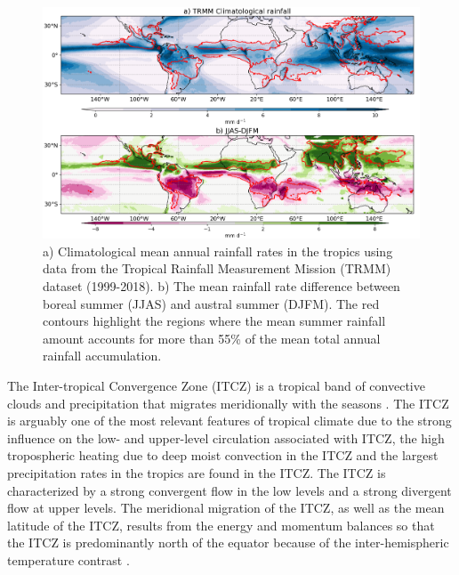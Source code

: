

\begin{figure}[b!]
\includegraphics[width=\linewidth]{figures/trmmclima.png}
\caption[The global monsoon rainfall]{a) Climatological mean annual rainfall rates in the tropics using data from the Tropical Rainfall Measurement Mission (TRMM) dataset (1999-2018). b) The mean rainfall rate difference between boreal summer (JJAS) and austral summer (DJFM). The red contours highlight the regions where the mean summer rainfall amount accounts for more than 55\% of the mean total annual rainfall accumulation. }
\label{fig:monsoon}
\end{figure}

The Inter-tropical Convergence Zone (ITCZ) is a tropical band of convective clouds and precipitation that migrates meridionally with the seasons \citep{schneider2014}. The ITCZ is arguably one of the most relevant features of tropical climate due to the strong influence on the low- and upper-level circulation associated with ITCZ, the high tropospheric heating due to deep moist convection in the ITCZ and the largest precipitation rates in the tropics are found in the ITCZ.
The ITCZ is characterized by a strong convergent flow in the low levels and a strong divergent flow at upper levels. 
The meridional migration of the ITCZ, as well as the mean latitude of the ITCZ, results from the energy and momentum balances so that the ITCZ is predominantly north of the equator because of the inter-hemispheric temperature contrast \citep{donohoe2013,bischoff2016}.

